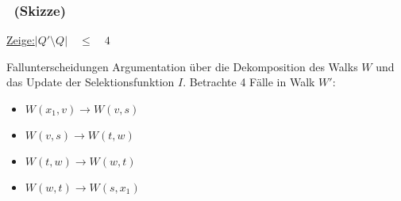 \begin{frame}
    \frametitle{\insertsubsection~(Skizze)}
    \underline{Zeige:}\qquad $|Q' \setminus Q| \quad \leq \quad 4$\\
    \vspace{1em}
    \begin{block}{Fallunterscheidungen}
        \vspace{.7em}
        Argumentation über die Dekomposition des Walks $W$ und das Update der Selektionsfunktion $I$.
        Betrachte 4 Fälle in Walk $W'$:
        \begin{itemize}
            \itemsep\setlength{.5em}
            \item $W(x_1, v) \rightarrow W(v, s)$
            \item $W(v, s) \rightarrow W(t, w)$
            \item $W(t, w) \rightarrow W(w, t)$
            \item $W(w, t) \rightarrow W(s, x_1)$
        \end{itemize}
        \vspace{.1em}
    \end{block}
\end{frame}
